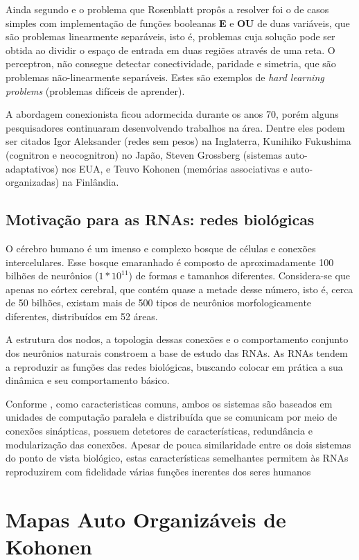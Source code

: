 \documentclass[
	12pt,				%
	openright,			%
	twoside,			%
	a4paper,			%
	english,			%
	french,				%
	spanish,			%
	brazil				%
	]{abntex2}
\begin{document}
Ainda segundo  e  o problema que Rosenblatt propôs a resolver foi o de casos simples com implementação de funções booleanas \textbf{E} e \textbf{OU} de duas variáveis, que são problemas linearmente separáveis, isto é, problemas cuja solução pode ser obtida ao dividir o espaço de entrada em duas regiões através de uma reta. O perceptron, não consegue detectar conectividade, paridade e simetria, que são problemas não-linearmente separáveis. Estes são exemplos de \textit{hard learning problems} (problemas difíceis de aprender).

A abordagem conexionista ficou adormecida durante os anos 70, porém alguns pesquisadores continuaram desenvolvendo trabalhos na área. Dentre eles podem ser citados Igor Aleksander (redes sem pesos) na Inglaterra, Kunihiko Fukushima (cognitron e neocognitron) no Japão, Steven Grossberg (sistemas auto-adaptativos) nos EUA, e Teuvo Kohonen (memórias associativas e auto-organizadas) na Finlândia.

\subsection{Motivação para as RNAs: redes biológicas}
O cérebro humano é um imenso e complexo bosque de células e conexões intercelulares. Esse bosque emaranhado é composto de aproximadamente 100 bilhões de neurônios ($ 1 * 10^{11}$) de formas e tamanhos diferentes. Considera-se que apenas no córtex cerebral, que contém quase a metade desse número, isto é, cerca de 50 bilhões, existam mais de 500 tipos de neurônios morfologicamente diferentes, distribuídos em 52 áreas.\cite[p.18]{mora2016continuum} 

A estrutura dos nodos, a topologia dessas conexões e o comportamento conjunto dos neurônios naturais constroem a base de estudo das RNAs. As RNAs tendem a reproduzir as funções das redes biológicas, buscando colocar em prática a sua dinâmica e seu comportamento básico. 

Conforme , como caracteristicas comuns, ambos os sistemas são baseados em unidades de computação paralela e distribuída que se comunicam por meio de conexões sinápticas, possuem detetores de características, redundância e modularização das conexões. Apesar de pouca similaridade entre os dois sistemas do ponto de vista biológico, estas características semelhantes permitem às RNAs reproduzirem com fidelidade várias funções inerentes dos seres humanos
\section{Mapas Auto Organizáveis de Kohonen}
\end{document}
